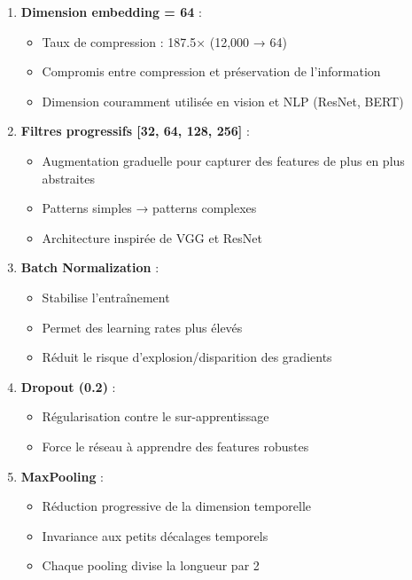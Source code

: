 \documentclass[12pt,a4paper]{article}
\begin{document}
\begin{enumerate}
    \item \textbf{Dimension embedding = 64} :
    \begin{itemize}
        \item Taux de compression : 187.5× (12,000 → 64)
        \item Compromis entre compression et préservation de l'information
        \item Dimension couramment utilisée en vision et NLP (ResNet, BERT)
    \end{itemize}

    \item \textbf{Filtres progressifs [32, 64, 128, 256]} :
    \begin{itemize}
        \item Augmentation graduelle pour capturer des features de plus en plus abstraites
        \item Patterns simples → patterns complexes
        \item Architecture inspirée de VGG et ResNet
    \end{itemize}

    \item \textbf{Batch Normalization} :
    \begin{itemize}
        \item Stabilise l'entraînement
        \item Permet des learning rates plus élevés
        \item Réduit le risque d'explosion/disparition des gradients
    \end{itemize}

    \item \textbf{Dropout (0.2)} :
    \begin{itemize}
        \item Régularisation contre le sur-apprentissage
        \item Force le réseau à apprendre des features robustes
    \end{itemize}

    \item \textbf{MaxPooling} :
    \begin{itemize}
        \item Réduction progressive de la dimension temporelle
        \item Invariance aux petits décalages temporels
        \item Chaque pooling divise la longueur par 2
    \end{itemize}
\end{enumerate}
\end{document}
